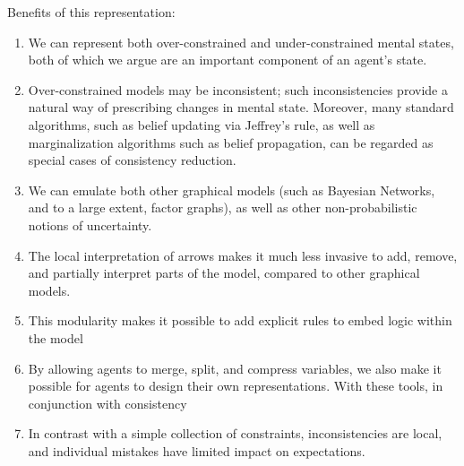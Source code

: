 \documentclass{article}
\begin{document}
	Benefits of this representation:
	\begin{enumerate}[nosep]
		\item We can represent both over-constrained and under-constrained mental states, both of which we argue are an important component of an agent's state.
		\item Over-constrained models may be inconsistent; such inconsistencies provide a natural way of prescribing changes in mental state. Moreover, many standard algorithms, such as belief updating via Jeffrey's rule, as well as marginalization algorithms such as belief propagation, can be regarded as special cases of consistency reduction.
		\item We can emulate both other graphical models (such as Bayesian Networks, and to a large extent, factor graphs), as well as other non-probabilistic notions of uncertainty. 
		\item The local interpretation of arrows makes it much less invasive to add, remove, and partially interpret parts of the model, compared to other graphical models. 
		\item This modularity makes it possible to add explicit rules to embed logic within the model
		\item By allowing agents to merge, split, and compress variables, we also make it possible for agents to design their own representations. With these tools, in conjunction with consistency 
		\item In contrast with a simple collection of constraints, inconsistencies are local, and individual mistakes have limited impact on expectations.
	\end{enumerate} %


	
\end{document}

